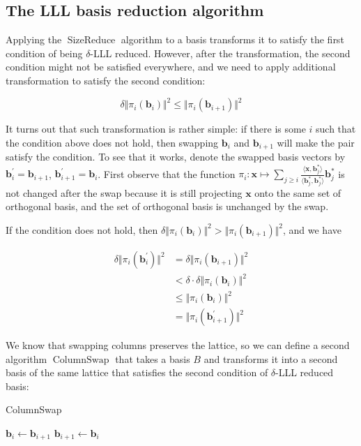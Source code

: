 \subsection{The LLL basis reduction algorithm}\label{subsec:lllreduce}
Applying the $\operatorname{SizeReduce}$ algorithm to a basis transforms it to satisfy the first condition of being $\delta$-LLL reduced. However, after the transformation, the second condition might not be satisfied everywhere, and we need to apply additional transformation to satisfy the second condition:

$$
\delta \Vert \pi_i(\mathbf{b}_i) \Vert^2 \leq \Vert \pi_i(\mathbf{b}_{i+1})\Vert^2
$$

It turns out that such transformation is rather simple: if there is some $i$ such that the condition above does not hold, then swapping $\mathbf{b}_i$ and $\mathbf{b}_{i+1}$ will make the pair satisfy the condition. To see that it works, denote the swapped basis vectors by $\mathbf{b}_i^\prime = \mathbf{b}_{i+1}$, $\mathbf{b}_{i+1}^\prime = \mathbf{b}_{i}$. First observe that the function $\pi_i: \mathbf{x} \mapsto \sum_{j\geq i}\frac{\langle \mathbf{x}, \mathbf{b}_j^\ast \rangle}{\langle \mathbf{b}_j^\ast, \mathbf{b}_j^\ast \rangle}\mathbf{b}_j^\ast$ is not changed after the swap because it is still projecting $\mathbf{x}$ onto the same set of orthogonal basis, and the set of orthogonal basis is unchanged by the swap.

If the condition does not hold, then $\delta\Vert\pi_i(\mathbf{b}_i)\Vert^2 > \Vert\pi_i(\mathbf{b}_{i+1})\Vert^2$, and we have

$$
\begin{aligned}
\delta \Vert\pi_i(\mathbf{b}_i^\prime)\Vert^2
&= \delta \Vert\pi_i(\mathbf{b}_{i+1})\Vert^2 \\
&< \delta \cdot \delta\Vert\pi_i(\mathbf{b}_i)\Vert^2 \\
&\leq \Vert\pi_i(\mathbf{b}_i)\Vert^2 \\
&= \Vert\pi_i(\mathbf{b}_{i+1}^\prime)\Vert^2
\end{aligned}
$$

We know that swapping columns preserves the lattice, so we can define a second algorithm $\operatorname{ColumnSwap}$ that takes a basis $B$ and transforms it into a second basis of the same lattice that satisfies the second condition of $\delta$-LLL reduced basis:

\begin{algorithm}
\caption{ColumnSwap}
\begin{algorithmic}[1]
            \State $\mathbf{b}_i \leftarrow \mathbf{b}_{i+1}$
            \State $\mathbf{b}_{i+1} \leftarrow \mathbf{b}_{i}$
        \EndIf
    \EndFor
\end{algorithmic}
\end{algorithm}

